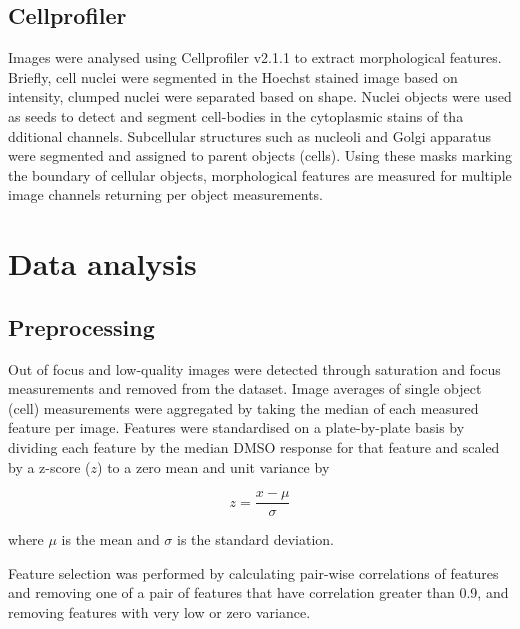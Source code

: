\documentclass[a4paper,11pt,twoside,openright]{scrbook}
\begin{document}
\subsection{Cellprofiler}
Images were analysed using Cellprofiler v2.1.1 to extract morphological features.
Briefly, cell nuclei were segmented in the Hoechst stained image based on intensity, clumped nuclei were separated based on shape.
Nuclei objects were used as seeds to detect and segment cell-bodies in the cytoplasmic stains of tha dditional channels.
Subcellular structures such as nucleoli and Golgi apparatus were segmented and assigned to parent objects (cells).
Using these masks marking the boundary of cellular objects, morphological features are measured for multiple image channels returning per object measurements.

\section{Data analysis}

\subsection{Preprocessing}
Out of focus and low-quality images were detected through saturation and focus measurements and removed from the dataset.
Image averages of single object (cell) measurements were aggregated by taking the median of each measured feature per image.
Features were standardised on a plate-by-plate basis by dividing each feature by the median DMSO response for that feature and scaled by a z-score ($z$) to a zero mean and unit variance by

\begin{equation} \label{eq:zscore}
    z = \frac{x - \mu}{\sigma}
\end{equation}

where $\mu$ is the mean and $\sigma$ is the standard deviation.

Feature selection was performed by calculating pair-wise correlations of features and removing one of a pair of features that have correlation greater than 0.9, and removing features with very low or zero variance.




\end{document}
